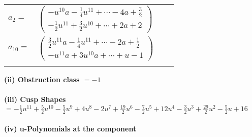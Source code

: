 \documentclass[1p]{elsarticle_modified}
\theoremstyle{definition}
\begin{document}
\begin{tabular}{m{7pt} m{180pt} m{7pt} m{180pt} }
\flushright $a_{2}=$&$\begin{pmatrix}- u^{10} a-\frac{1}{4} u^{11}+\cdots-4 a+\frac{3}{2}\\-\frac{1}{2} u^{11}+\frac{3}{2} u^{10}+\cdots+2 a+2\end{pmatrix}$ \\
\flushright $a_{10}=$&$\begin{pmatrix}\frac{3}{2} u^{11} a-\frac{1}{4} u^{11}+\cdots-2 a+\frac{1}{2}\\- u^{11} a+3 u^{10} a+\cdots+u-1\end{pmatrix}$\\&\end{tabular}
\flushleft \textbf{(ii) Obstruction class $= -1$}\\~\\
\flushleft \textbf{(iii) Cusp Shapes $= -\frac{1}{2} u^{11}+\frac{5}{2} u^{10}-\frac{5}{2} u^9+4 u^8-2 u^7+\frac{19}{2} u^6-\frac{7}{2} u^5+12 u^4-\frac{3}{2} u^3+\frac{29}{2} u^2-\frac{5}{2} u+16$}\\~\\
\newpage\renewcommand{\arraystretch}{1}
\flushleft \textbf{(iv) u-Polynomials at the component}\newline \\
\end{document}
